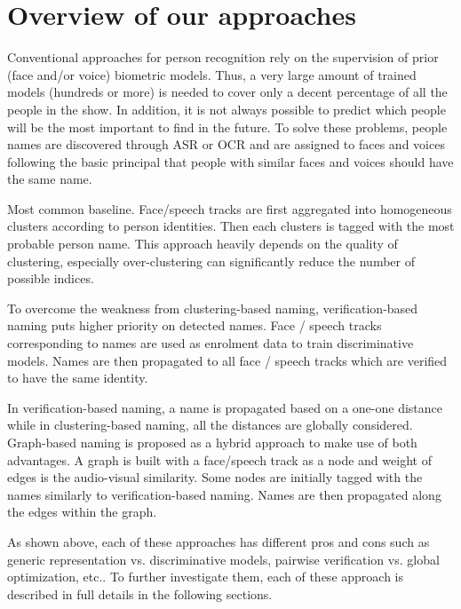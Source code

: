 \section{Overview of our approaches}
\label{sec:overview}

Conventional approaches for person recognition rely on the supervision of prior (face and/or voice) biometric models. Thus, a very large amount of trained models (hundreds or more) is needed to cover only a decent percentage of all the people in the show.
%
In addition, it is not always possible to predict which people will be the most important to find in the future.
%
To solve these problems, people names are discovered through ASR or OCR and are assigned to faces and voices following the basic principal that people with similar faces and voices should have the same name.
%

 Most common baseline. Face/speech tracks are first aggregated into homogeneous clusters according to person identities. Then each clusters is tagged with the most probable person name. This approach heavily depends on the quality of clustering, especially over-clustering can significantly reduce the number of possible indices.

 To overcome the weakness from clustering-based naming, verification-based naming puts higher priority on detected names. Face / speech tracks corresponding to names are used as enrolment data to train discriminative models. Names are then propagated to all face / speech tracks which are verified to have the same identity.

 In verification-based naming, a name is propagated based on a one-one distance while in clustering-based naming, all the distances are globally considered. Graph-based naming is proposed as a hybrid approach to make use of both advantages.
A graph is built with a face/speech track as a node and weight of edges is the audio-visual similarity. Some nodes are initially tagged with the names similarly to verification-based naming. Names are then propagated along the edges within the graph.

As shown above, each of these approaches has different pros and cons such as generic representation vs. discriminative models, pairwise verification vs. global optimization, etc..
%
To further investigate them, each of these approach is described in full details in the following sections. 

\endinput